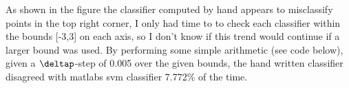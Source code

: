 \documentclass{jhwhw}
\begin{document}
    \begin{center}
	\begin{figure}[H]
	    \centering
	\end{figure}
    \end{center}

    As shown in the figure the classifier computed by hand appears to misclassify points in the top right corner,
    I only had time to to check each classifier within the bounds [-3,3] on each axis, so I don't know if this trend
    would continue if a larger bound was used. By performing some simple arithmetic (see code below), given a
    $\deltap$-step of 0.005 over the given bounds, the hand written classifier disagreed with matlabs svm
    classifier 7.772\% of the time. \\
\end{document}
